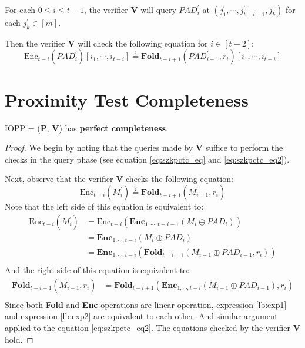 \begin{enumerate}
    For each $0 \le i \le t-1$, 
    the verifier $\textbf{V}$ will query $PAD_{i}^{\prime}$ at $(j_1^\prime, \cdots, j_{t-i-1}^\prime, j_k^\prime)$ for each $j_k^\prime \in [m]$. 
    
    Then the verifier $\textbf{V}$ will check the following equation for $i \in [t-2]$:
\begin{equation}
\label{eq:szkpctc_eq2}
    \text{Enc}_{t-i}(PAD_i^\prime)[i_1, \cdots, i_{t-i}] \stackrel{?}{=} \textbf{Fold}_{t-i+1}(PAD_{i-1}^\prime, r_i) [i_1, \cdots, i_{t-i}]
\end{equation}




\end{enumerate}

\section{Proximity Test Completeness}

\begin{lemma}
\label{lemma:szkpctcc}

IOPP = ($\textbf{P}$, $\textbf{V}$) has \textbf{perfect completeness}.

\end{lemma}
\begin{proof}
We begin by noting that the queries made by $\textbf{V}$ suffice to perform the checks in the query phase (see equation \ref{eq:szkpctc_eq} and \ref{eq:szkpctc_eq2}).

Next, observe that the verifier $\textbf{V}$ checks the following equation:
$$
    \text{Enc}_{t-i}(M_i^\prime) \stackrel{?}{=} 
    \textbf{Fold}_{t-i+1}(M_{i-1}^\prime, r_i) 
$$
Note that the left side of this equation is equivalent to:
\begin{align}
\text{Enc}_{t-i}(M_i^\prime) \nonumber
&= \text{Enc}_{t-i}(\textbf{Enc}_{1, \cdots, t- i - 1}(M_i \oplus PAD_i)) \nonumber \\
&= \textbf{Enc}_{1, \cdots, t-i}(M_i \oplus PAD_i) \nonumber \\
&= \textbf{Enc}_{1, \cdots, t-i}(\textbf{Fold}_{t-i+1}(M_{i-1} \oplus PAD_{i-1}, r_i)) \label{lb:exp1} \\
\end{align}
And the right side of this equation is equivalent to:
\begin{align}
\textbf{Fold}_{t-i+1}(M_{i-1}^\prime, r_i) 
&= \textbf{Fold}_{t-i+1}(\textbf{Enc}_{1, \cdots, t- i}(M_{i-1} \oplus PAD_{i-1}), r_i) \label{lb:exp2} \\
\end{align}
Since both \textbf{Fold} and \textbf{Enc} operations are linear operation, expression \ref{lb:exp1} and  expression \ref{lb:exp2} are equivalent to each other. And similar argument applied to the equation \ref{eq:szkpctc_eq2}.
The equations checked by the verifier $\textbf{V}$ hold.

\end{proof}




